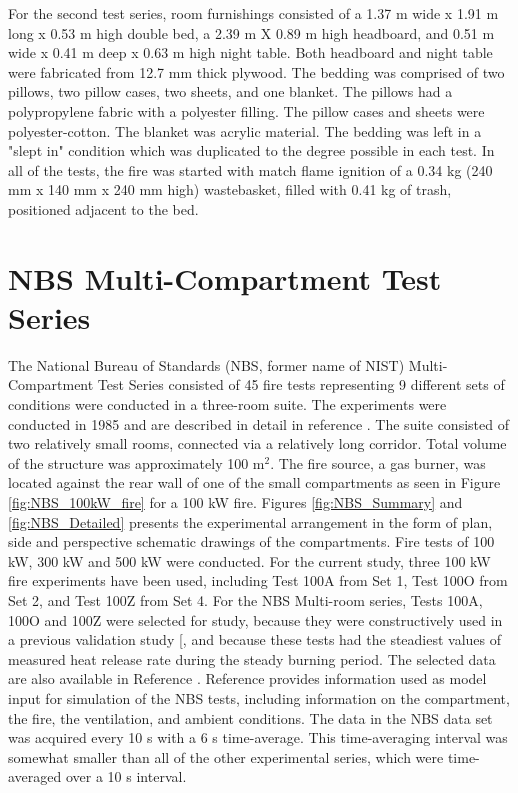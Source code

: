 For the second test series, room furnishings consisted of a 1.37 m wide x 1.91 m long x 0.53 m high double bed, a 2.39 m X 0.89 m high headboard, and 0.51 m wide x 0.41 m deep x 0.63 m high night table. Both headboard and night table were fabricated from 12.7 mm thick plywood. The bedding was comprised of two pillows, two pillow cases, two sheets, and one blanket. The pillows had a polypropylene fabric with a polyester filling. The pillow cases and sheets were polyester-cotton. The blanket was acrylic material. The bedding was left in a "slept in" condition which was duplicated to the degree possible in each test. In all of the tests, the fire was started with match flame ignition of a 0.34 kg (240 mm x 140 mm x 240 mm high) wastebasket, filled with 0.41 kg of trash, positioned adjacent to the bed.

\section{NBS Multi-Compartment Test Series}

The National Bureau of Standards (NBS, former name of NIST) Multi-Compartment Test Series consisted of 45 fire tests representing 9 different sets of conditions were conducted in a three-room suite.  The experiments were conducted in 1985 and are described in detail in reference \cite{Peacock:1988}.  The suite consisted of two relatively small rooms, connected via a relatively long corridor. Total volume of the structure was approximately 100 m$^2$. The fire source, a gas burner, was located against the rear wall of one of the small compartments as seen in Figure \ref{fig:NBS_100kW_fire} for a 100 kW fire.  Figures \ref{fig:NBS_Summary} and \ref{fig:NBS_Detailed} presents the experimental arrangement in the form of plan, side and perspective schematic drawings of the compartments. Fire tests of 100 kW, 300 kW and 500 kW were conducted. For the current  study, three 100 kW fire experiments have been used, including Test 100A from Set 1, Test 100O from Set 2, and Test 100Z from Set 4. For the NBS Multi-room series, Tests 100A, 100O and 100Z were selected for study, because they were constructively used in a previous validation study [\cite{EPRI}, and because these tests had  the steadiest values of measured heat release rate during the steady burning period. The selected data are also available in Reference \cite{EPRI}.   Reference \cite{NRCNUREG1824} provides information used as model input for simulation of the NBS tests, including information on the compartment, the fire, the ventilation, and ambient conditions. The data in the NBS data set was acquired every 10 s with a 6 s time-average.  This time-averaging interval was somewhat smaller than all of the other experimental series, which were time-averaged over a 10 s interval.

